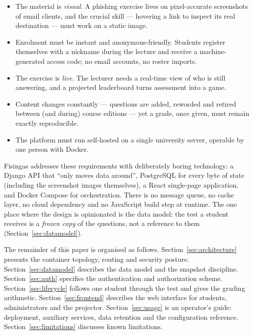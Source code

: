 \documentclass[11pt,a4paper]{article}
\begin{document}
\begin{itemize}
  \item The material is \emph{visual}. A phishing exercise lives on
        pixel-accurate screenshots of email clients, and the crucial
        skill --- hovering a link to inspect its real destination ---
        must work on a static image.
  \item Enrolment must be instant and anonymous-friendly. Students
        register themselves with a nickname during the lecture and
        receive a machine-generated access code; no email accounts, no
        roster imports.
  \item The exercise is \emph{live}. The lecturer needs a real-time
        view of who is still answering, and a projected leaderboard
        turns assessment into a game.
  \item Content changes constantly --- questions are added, reworded
        and retired between (and during) course editions --- yet a
        grade, once given, must remain exactly reproducible.
  \item The platform must run self-hosted on a single university
        server, operable by one person with Docker.
\end{itemize}

Fisingas addresses these requirements with deliberately boring
technology: a Django API that ``only moves data around'', PostgreSQL
for every byte of state (including the screenshot images themselves),
a React single-page application, and Docker Compose for orchestration.
There is no message queue, no cache layer, no cloud dependency and no
JavaScript build step at runtime. The one place where the design is
opinionated is the data model: the test a student receives is a
\emph{frozen copy} of the questions, not a reference to them
(Section~\ref{sec:datamodel}).

The remainder of this paper is organised as follows.
Section~\ref{sec:architecture} presents the container topology,
routing and security posture. Section~\ref{sec:datamodel} describes
the data model and the snapshot discipline.
Section~\ref{sec:auth} specifies the authentication and authorization
scheme. Section~\ref{sec:lifecycle} follows one student through the
test and gives the grading arithmetic. Section~\ref{sec:frontend}
describes the web interface for students, administrators and the
projector. Section~\ref{sec:usage} is an operator's guide: deployment,
auxiliary services, data retention and the configuration reference.
Section~\ref{sec:limitations} discusses known limitations.
\end{document}
